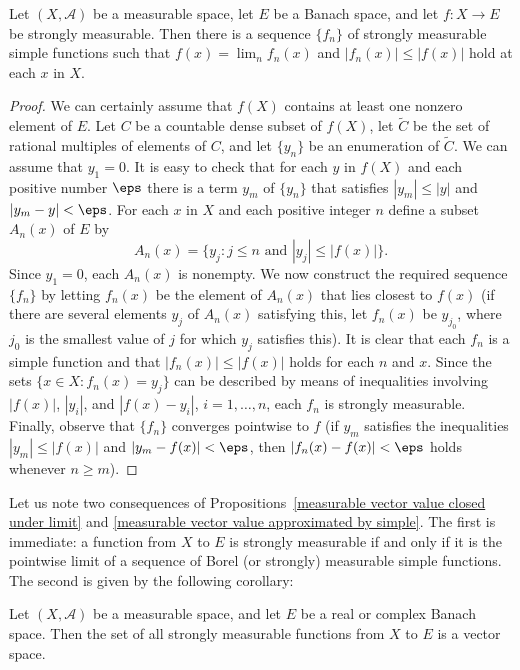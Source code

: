 \begin{proposition}\label{measurable vector value approximated by simple}
Let $(X,\mathcal{A})$ be a measurable space, let $E$ be a Banach space, and let $f:X\to E$ be strongly measurable. Then there is a sequence $\{f_n\}$ of strongly measurable simple functions such that $f(x)=\lim_nf_n(x)$ and $|f_n(x)|\leq|f(x)|$ hold at each $x$ in $X$.
\end{proposition}
\begin{proof}
We can certainly assume that $f(X)$ contains at least one nonzero element of $E$. Let $C$ be a countable dense subset of $f(X)$, let $\widetilde{C}$ be the set of rational multiples of elements of $C$, and let $\{y_n\}$ be an enumeration of $\widetilde{C}$. We can assume that $y_1=0$. It is easy to check that for each $y$ in $f(X)$ and each positive number $\eps$ there is a term $y_m$ of $\{y_n\}$ that satisfies $|y_m|\leq|y|$ and $|y_m-y|<\eps$. For each $x$ in $X$ and each positive integer $n$ define a subset $A_n(x)$ of $E$ by
\[A_n(x)=\{y_j:j\leq n\text{ and }|y_j|\leq|f(x)|\}.\]
Since $y_1=0$, each $A_n(x)$ is nonempty. We now construct the required sequence $\{f_n\}$ by letting $f_n(x)$ be the element of $A_n(x)$ that lies closest to $f(x)$ (if there are several elements $y_j$ of $A_n(x)$ satisfying this, let $f_n(x)$ be $y_{j_0}$, where $j_0$ is the smallest value of $j$ for which $y_j$ satisfies this). It is clear that each $f_n$ is a simple function and that $|f_n(x)|\leq|f(x)|$ holds for each $n$ and $x$. Since the sets $\{x\in X:f_n(x)=y_j\}$ can be described by means of inequalities involving $|f(x)|$, $|y_i|$, and $|f(x)-y_i|$, $i=1,\dots,n$, each $f_n$ is strongly measurable. Finally, observe that $\{f_n\}$ converges pointwise to $f$ (if $y_m$ satisfies the inequalities $|y_m|\leq |f(x)|$ and $|y_m-f(x)|<\eps$, then $|f_n(x)-f(x)|<\eps$ holds whenever $n\geq m$). 
\end{proof}
Let us note two consequences of Propositions~\ref{measurable vector value closed under limit} and \ref{measurable vector value approximated by simple}. The first is immediate: a function from $X$ to $E$ is strongly measurable if and only if it is the pointwise limit of a sequence of Borel (or strongly) measurable simple functions. The second is given by the following corollary:
\begin{corollary}\label{measurable vector value is vector space}
Let $(X,\mathcal{A})$ be a measurable space, and let $E$ be a real or complex Banach space. Then the set of all strongly measurable functions from $X$ to $E$ is a vector space.
\end{corollary}
